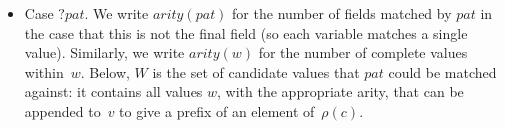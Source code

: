 \begin{itemize}
\begin{itemize}
\item Case $?pat$.  We write $arity(pat)$ for the number of fields matched by
  $pat$ in the case that this is not the final field (so each variable matches
  a single value).  Similarly, we write $arity(w)$ for the number of complete
  values within~$w$.  Below, $W$ is the set of candidate values that $pat$
  could be matched against: it contains all values $w$, with the appropriate
  arity, that can be appended to~$v$ to give a prefix of an element
  of~$\rho(c)$.
%
\end{itemize}
\end{itemize}
